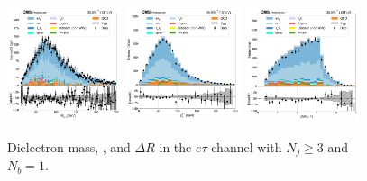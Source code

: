 \begin{figure}[htb!]
    \centering
    \includegraphics[width=0.3\textwidth]{chapters/Appendix/sectionPlots/figures/data_mc_overlays/etau_2016_cat_gt3_eq1_signal_linear_lepton_dilepton1_mass}
    \includegraphics[width=0.3\textwidth]{chapters/Appendix/sectionPlots/figures/data_mc_overlays/etau_2016_cat_gt3_eq1_signal_linear_lepton_dilepton1_pt}
    \includegraphics[width=0.3\textwidth]{chapters/Appendix/sectionPlots/figures/data_mc_overlays/etau_2016_cat_gt3_eq1_signal_linear_lepton_dilepton1_delta_r}
    \caption{Dielectron mass, \pt, and $\Delta R$ in the $e\tau$ channel
    with $N_{j} \geq 3$ and $N_{b} = 1$.}
    \label{fig:etau_7_dilepton}
\end{figure}

